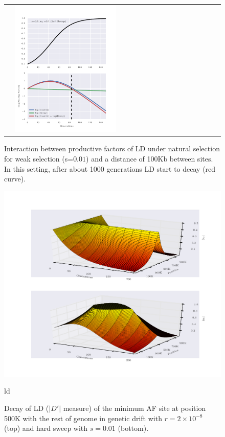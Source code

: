 \documentclass[11pt]{article}
\begin{document}
\begin{figure}[H]
\begin{tabular}{l|l}
			&\includegraphics[width=0.5\textwidth]{figures/decayFactors3}		
	\end{tabular}

	\caption{Interaction between productive factors of LD under natural 
		selection for weak selection (s=$0.01$) and a distance of 100Kb between 
		sites. In this setting, after about 1000 generations LD start to decay 
		(red 
		curve).} \label{fig:ldf}
\end{figure}




\begin{figure}[H]
	\centering
	\includegraphics[width=\textwidth]{figures/LDDecay3d}
	\caption{ld} \label{fig:ld3d}
	\caption{Decay of LD ($|D'|$ measure) of the minimum AF site at 
		position 500K with the rest of genome in genetic drift with 
		$r=2\times10^{-8}$ (top) and hard sweep with $s=0.01$ (bottom).}
\end{figure}
\end{document}
